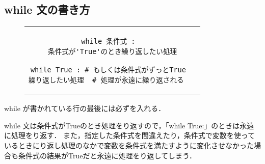 \documentclass{jsarticle}
\begin{document}
\subsection{while 文の書き方}
\begin{figure}[h]
	\begin{tabular}{cc}
		\begin{minipage}[c]{.45\textwidth}
			\begin{lstlisting}[caption=while 文の基本構文]
while 条件式 :
  条件式が'True'のとき繰り返したい処理\end{lstlisting}
		\end{minipage} \hspace{3mm}
		\begin{minipage}[c]{.55\textwidth}
			\begin{lstlisting}[caption=while 文の注意点]
while True : # もしくは条件式がずっとTrue
繰り返したい処理  # 処理が永遠に繰り返される \end{lstlisting}
		\end{minipage}
	\end{tabular}
\end{figure}
while が書かれている行の最後には必ずを入れる． \par
while 文は条件式がTrueのとき処理をり返すので，「while True:」のときは永遠に処理をり返す．
また，指定した条件式を間違えたり，条件式で変数を使っているときにり返し処理のなかで変数を条件式を満たすように変化させなかった場合も条件式の結果がTrueだと永遠に処理をり返してしまう．
\newpage
\end{document}
